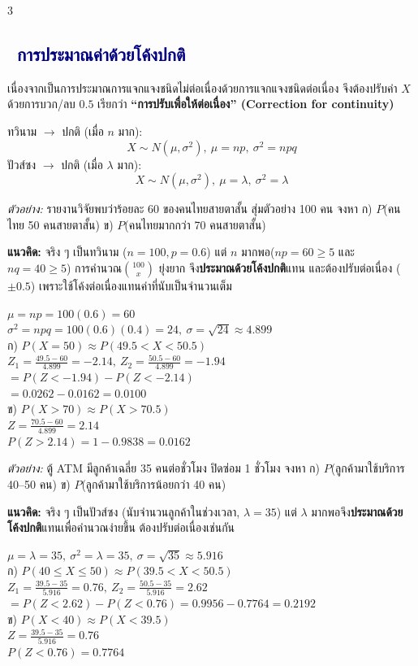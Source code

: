 \documentclass[9pt]{extarticle}
\newcommand{\dist}[1]{\subsection*{\textcolor{navy}{\textbullet\ #1}}}
\begin{document}
\begin{multicols}{3}
\dist{การประมาณค่าด้วยโค้งปกติ}
เนื่องจากเป็น\allowbreak การประมาณ\allowbreak การแจกแจง\allowbreak ชนิดไม่ต่อเนื่อง\allowbreak ด้วยการแจกแจง\allowbreak ชนิดต่อเนื่อง จึงต้องปรับค่า $X$ ด้วย\allowbreak การบวก/ลบ $0.5$ เรียกว่า \textbf{``การปรับเพื่อให้ต่อเนื่อง'' (Correction for continuity)}

\begin{formulabox}
ทวินาม $\to$ ปกติ (เมื่อ $n$ มาก):
$$X\sim N(\mu,\sigma^2),\ \mu=np,\ \sigma^2=npq$$
ปัวส์ซง $\to$ ปกติ (เมื่อ $\lambda$ มาก):
$$X\sim N(\mu,\sigma^2),\ \mu=\lambda,\ \sigma^2=\lambda$$
\end{formulabox}

\textit{ตัวอย่าง:} รายงานวิจัยพบว่าร้อยละ 60 ของคนไทยสายตาสั้น สุ่มตัวอย่าง 100 คน จงหา ก) $P$(คนไทย 50 คนสายตาสั้น) ข) $P$(คนไทยมากกว่า 70 คนสายตาสั้น)
\begin{ideabox}
\textbf{แนวคิด:} จริง ๆ เป็น\allowbreak ทวินาม ($n{=}100,p{=}0.6$) แต่ $n$ มากพอ\allowbreak ($np{=}60\ge5$ และ $nq{=}40\ge5$) การคำนวณ\allowbreak $\binom{100}{x}$ ยุ่งยาก จึง\textbf{ประมาณด้วย\allowbreak โค้งปกติ}แทน และต้อง\allowbreak ปรับต่อเนื่อง ($\pm0.5$) เพราะใช้\allowbreak โค้งต่อเนื่องแทน\allowbreak ค่าที่นับเป็น\allowbreak จำนวนเต็ม
\end{ideabox}
\begin{solbox}
$\mu=np=100(0.6)=60$\\
$\sigma^2=npq=100(0.6)(0.4)=24,\ \sigma=\sqrt{24}\approx4.899$\\
ก) $P(X{=}50)\approx P(49.5{<}X{<}50.5)$\\
$Z_1=\frac{49.5-60}{4.899}=-2.14,\ Z_2=\frac{50.5-60}{4.899}=-1.94$\\
$=P(Z{<}{-1.94})-P(Z{<}{-2.14})$\\
$=0.0262-0.0162=0.0100$\\
ข) $P(X{>}70)\approx P(X{>}70.5)$\\
$Z=\frac{70.5-60}{4.899}=2.14$\\
$P(Z{>}2.14)=1-0.9838=0.0162$
\end{solbox}

\textit{ตัวอย่าง:} ตู้ ATM มีลูกค้าเฉลี่ย 35 คนต่อชั่วโมง ปิดซ่อม 1 ชั่วโมง จงหา ก) $P$(ลูกค้ามาใช้บริการ 40--50 คน) ข) $P$(ลูกค้ามาใช้บริการน้อยกว่า 40 คน)
\begin{ideabox}
\textbf{แนวคิด:} จริง ๆ เป็น\allowbreak ปัวส์ซง (นับจำนวน\allowbreak ลูกค้าในช่วงเวลา, $\lambda{=}35$) แต่ $\lambda$ มากพอ\allowbreak จึง\textbf{ประมาณด้วย\allowbreak โค้งปกติ}แทนเพื่อ\allowbreak คำนวณง่ายขึ้น ต้องปรับ\allowbreak ต่อเนื่องเช่นกัน
\end{ideabox}
\begin{solbox}
$\mu=\lambda=35,\ \sigma^2=\lambda=35,\ \sigma=\sqrt{35}\approx5.916$\\
ก) $P(40{\le}X{\le}50)\approx P(39.5{<}X{<}50.5)$\\
$Z_1=\frac{39.5-35}{5.916}=0.76,\ Z_2=\frac{50.5-35}{5.916}=2.62$\\
$=P(Z{<}2.62)-P(Z{<}0.76)=0.9956-0.7764=0.2192$\\
ข) $P(X{<}40)\approx P(X{<}39.5)$\\
$Z=\frac{39.5-35}{5.916}=0.76$\\
$P(Z{<}0.76)=0.7764$
\end{solbox}


\end{multicols}
\end{document}
